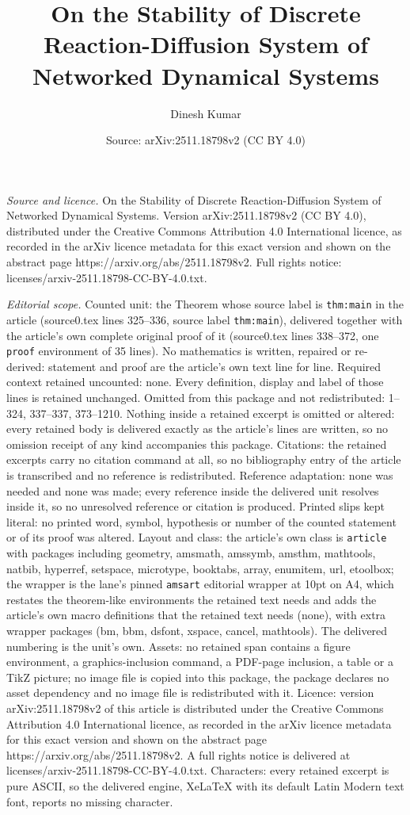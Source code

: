 \documentclass[10pt,a4paper]{amsart}
\title[On the Stability of Discrete Reaction-Diffusion System of Ne]{On the Stability of Discrete Reaction-Diffusion System of Networked Dynamical Systems}
\author{Dinesh Kumar}
\date{Source: arXiv:2511.18798v2 (CC BY 4.0)}
\begin{document}
\maketitle

\noindent\emph{Source and licence.} On the Stability of Discrete Reaction-Diffusion System of Networked Dynamical Systems. Version arXiv:2511.18798v2 (CC BY 4.0), distributed under the Creative Commons Attribution 4.0 International licence, as recorded in the arXiv licence metadata for this exact version and shown on the abstract page https://arxiv.org/abs/2511.18798v2. Full rights notice: licenses/arxiv-2511.18798-CC-BY-4.0.txt.\par\smallskip

\noindent\textit{Editorial scope.} Counted unit: the Theorem whose source label is \texttt{thm:main} in the article (source0.tex lines 325--336, source label \texttt{thm:main}), delivered together with the article's own complete original proof of it (source0.tex lines 338--372, one \texttt{proof} environment of 35 lines). No mathematics is written, repaired or re-derived: statement and proof are the article's own text line for line. Required context retained uncounted: none. Every definition, display and label of those lines is retained unchanged. Omitted from this package and not redistributed: 1--324, 337--337, 373--1210. Nothing inside a retained excerpt is omitted or altered: every retained body is delivered exactly as the article's lines are written, so no omission receipt of any kind accompanies this package. Citations: the retained excerpts carry no citation command at all, so no bibliography entry of the article is transcribed and no reference is redistributed. Reference adaptation: none was needed and none was made; every reference inside the delivered unit resolves inside it, so no unresolved reference or citation is produced. Printed slips kept literal: no printed word, symbol, hypothesis or number of the counted statement or of its proof was altered. Layout and class: the article's own class is \texttt{article} with packages including geometry, amsmath, amssymb, amsthm, mathtools, natbib, hyperref, setspace, microtype, booktabs, array, enumitem, url, etoolbox; the wrapper is the lane's pinned \texttt{amsart} editorial wrapper at 10pt on A4, which restates the theorem-like environments the retained text needs and adds the article's own macro definitions that the retained text needs (none), with extra wrapper packages (bm, bbm, dsfont, xspace, cancel, mathtools). The delivered numbering is the unit's own. Assets: no retained span contains a figure environment, a graphics-inclusion command, a PDF-page inclusion, a table or a TikZ picture; no image file is copied into this package, the package declares no asset dependency and no image file is redistributed with it. Licence: version arXiv:2511.18798v2 of this article is distributed under the Creative Commons Attribution 4.0 International licence, as recorded in the arXiv licence metadata for this exact version and shown on the abstract page https://arxiv.org/abs/2511.18798v2. A full rights notice is delivered at licenses/arxiv-2511.18798-CC-BY-4.0.txt. Characters: every retained excerpt is pure ASCII, so the delivered engine, XeLaTeX with its default Latin Modern text font, reports no missing character.
\end{document}
